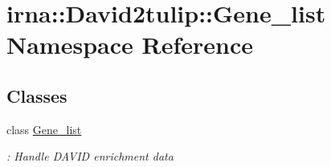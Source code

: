 \hypertarget{namespaceirna_1_1David2tulip_1_1Gene__list}{
\section{irna\-:\-:\-David2tulip\-:\-:\-Gene\-\_\-list \-Namespace \-Reference}
\label{namespaceirna_1_1David2tulip_1_1Gene__list}
}
\subsection*{\-Classes}
\begin{DoxyCompactItemize}
\item 
class \hyperlink{classirna_1_1David2tulip_1_1Gene__list_1_1Gene__list}{\-Gene\-\_\-list}
\begin{DoxyCompactList}\small\item\em \-: \-Handle \-D\-A\-V\-I\-D enrichment data \end{DoxyCompactList}\end{DoxyCompactItemize}
